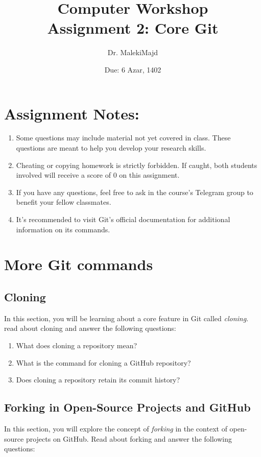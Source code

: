\documentclass[titlepage]{article}
\title{Computer Workshop\\Assignment 2: Core Git}
\author{Dr. MalekiMajd}
\date{Due: 6 Azar, 1402}
\begin{document}
\maketitle

\section*{Assignment Notes:}
\begin{enumerate}
    \item Some questions may include material not yet covered in class. These questions are meant to help you develop your research skills.
    \item Cheating or copying homework is strictly forbidden. If caught, both students involved will receive a score of 0 on this assignment.
    \item If you have any questions, feel free to ask in the course's Telegram group to benefit your fellow classmates.
    \item It's recommended to visit Git's official documentation for additional information on its commands.
\end{enumerate}

\pagebreak

\section{More Git commands}
\subsection{Cloning}
In this section, you will be learning about a core feature in Git called \textit{cloning}. read about
cloning and answer the following questions:
\begin{enumerate}
    \item What does cloning a repository mean?
    \item What is the command for cloning a GitHub repository?
    \item Does cloning a repository retain its commit history?
\end{enumerate}

\subsection{Forking in Open-Source Projects and GitHub}

In this section, you will explore the concept of \textit{forking} in the context of open-source projects on GitHub. Read about forking and answer the following questions:
\end{document}

